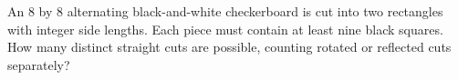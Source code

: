An $8$ by $8$ alternating black-and-white checkerboard is cut into two rectangles with integer side lengths. Each piece must contain at least nine black squares. How many distinct straight cuts are possible, counting rotated or reflected cuts separately?
